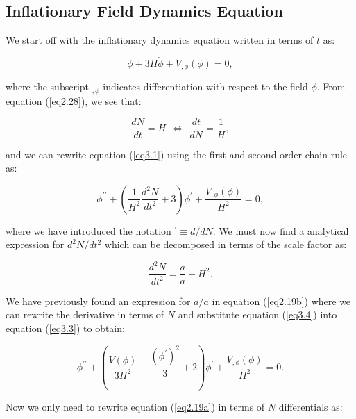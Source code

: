 \documentclass[a4paper,12pt,twoside]{report}
\begin{document}
\subsection{Inflationary Field Dynamics Equation} \label{subsec:InflatDynEq}

We start off with the inflationary dynamics equation written in terms of $t$ as:

\begin{equation} \label{eq3.1}
\ddot{\phi} + 3H\dot{\phi} +V_{,\phi}(\phi) = 0,
\end{equation}

where the subscript $_{, \phi}$ indicates differentiation with respect to the field $\phi$. From equation (\ref{eq2.28}), we see that:

\begin{equation} \label{eq3.2}
\frac{dN}{dt} = H \hspace{5pt} \Leftrightarrow \hspace{5pt} \frac{dt}{dN} = \frac{1}{H},
\end{equation}

and we can rewrite equation (\ref{eq3.1}) using the first and second order chain rule as:

\begin{equation} \label{eq3.3}
\phi^{\prime \prime} + \left(\frac{1}{H^{2}}\frac{d^{2}N}{dt^{2}} + 3\right)\phi^{\prime} + \frac{V_{,\phi}(\phi)}{H^{2}} = 0,
\end{equation}

where we have introduced the notation $^{\prime} \equiv d/dN$. We must now find a analytical expression for $d^{2}N/dt^{2}$ which can be decomposed in terms of the scale factor as:

\begin{equation} \label{eq3.4}
\frac{d^{2}N}{dt^{2}} = \frac{\ddot{a}}{a} - H^{2}.
\end{equation}

We have previously found an expression for $\ddot{a}/a$ in equation (\ref{eq2.19b}) where we can rewrite the derivative in terms of $N$ and substitute equation (\ref{eq3.4}) into equation (\ref{eq3.3}) to obtain:

\begin{equation} \label{eq3.5}
\phi^{\prime \prime} + \left(\frac{V(\phi)}{3H^{2}} - \frac{(\phi^{\prime})^{2}}{3} + 2\right)\phi^{\prime} + \frac{V_{,\phi}(\phi)}{H^{2}} = 0.
\end{equation}

Now we only need to rewrite equation (\ref{eq2.19a}) in terms of $N$ differentials as:
\end{document}
